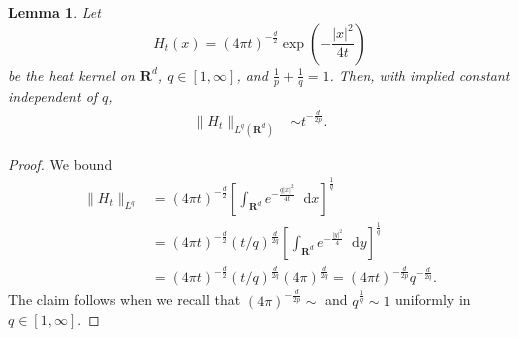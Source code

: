 \documentclass[reqno,11pt]{amsart}
\newcommand{\RR}{\mathbf{R}}
\newcommand*\dif{\mathop{}\!\mathrm{d}}
\newcommand{\dfn}[1]{\emph{#1}\index{#1}}
\newtheorem{lemma}[theorem]{Lemma}
\theoremstyle{definition}
\numberwithin{equation}{section}
\newcommand\todo[1]{\textcolor{red}{TODO: #1}}
\begin{document}
\begin{lemma}
Let
$$H_t(x) = (4\pi t)^{-\frac{d}{2}} \exp\left(-\frac{|x|^2}{4t}\right)$$
be the heat kernel on $\RR^d$, $q \in [1, \infty]$, and $\frac{1}{p} + \frac{1}{q} = 1$.
Then, with implied constant independent of $q$,
\begin{align}
\|H_t\|_{L^q(\RR^d)} &\sim t^{-\frac{d}{2p}}. \label{lq norm of heat kernel}
\end{align}
\end{lemma}
\begin{proof}
We bound
\begin{align*}
\|H_t\|_{L^q}
&= (4\pi t)^{-\frac{d}{2}} \left[\int_{\RR^d} e^{-\frac{q|x|^2}{4t}} \dif x\right]^{\frac{1}{q}} \\
&= (4\pi t)^{-\frac{d}{2}} (t/q)^{\frac{d}{2q}} \left[\int_{\RR^d} e^{-\frac{|y|^2}{4}} \dif y\right]^{\frac{1}{q}} \\
&= (4\pi t)^{-\frac{d}{2}} (t/q)^{\frac{d}{2q}} (4\pi)^{\frac{d}{2q}} = (4\pi t)^{-\frac{d}{2p}} q^{-\frac{d}{2q}}.
\end{align*}
The claim follows when we recall that $(4\pi)^{-\frac{d}{2p}} \sim$ and $q^{\frac{1}{q}} \sim 1$ uniformly in $q \in [1, \infty]$.
\end{proof}
\end{document}
